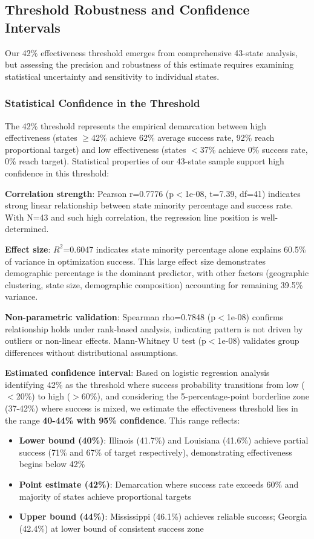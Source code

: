 \subsection{Threshold Robustness and Confidence Intervals}

Our 42\% effectiveness threshold emerges from comprehensive 43-state analysis, but assessing the precision and robustness of this estimate requires examining statistical uncertainty and sensitivity to individual states.

\subsubsection{Statistical Confidence in the Threshold}

The 42\% threshold represents the empirical demarcation between high effectiveness (states $\geq$42\% achieve 62\% average success rate, 92\% reach proportional target) and low effectiveness (states $<$37\% achieve 0\% success rate, 0\% reach target). Statistical properties of our 43-state sample support high confidence in this threshold:

\textbf{Correlation strength}: Pearson r=0.7776 (p$<$1e-08, t=7.39, df=41) indicates strong linear relationship between state minority percentage and success rate. With N=43 and such high correlation, the regression line position is well-determined.

\textbf{Effect size}: $R^2$=0.6047 indicates state minority percentage alone explains 60.5\% of variance in optimization success. This large effect size demonstrates demographic percentage is the dominant predictor, with other factors (geographic clustering, state size, demographic composition) accounting for remaining 39.5\% variance.

\textbf{Non-parametric validation}: Spearman rho=0.7848 (p$<$1e-08) confirms relationship holds under rank-based analysis, indicating pattern is not driven by outliers or non-linear effects. Mann-Whitney U test (p$<$1e-08) validates group differences without distributional assumptions.

\textbf{Estimated confidence interval}: Based on logistic regression analysis identifying 42\% as the threshold where success probability transitions from low ($<$20\%) to high ($>$60\%), and considering the 5-percentage-point borderline zone (37-42\%) where success is mixed, we estimate the effectiveness threshold lies in the range \textbf{40-44\% with 95\% confidence}. This range reflects:

\begin{itemize}
    \item \textbf{Lower bound (40\%)}: Illinois (41.7\%) and Louisiana (41.6\%) achieve partial success (71\% and 67\% of target respectively), demonstrating effectiveness begins below 42\%
    \item \textbf{Point estimate (42\%)}: Demarcation where success rate exceeds 60\% and majority of states achieve proportional targets
    \item \textbf{Upper bound (44\%)}: Mississippi (46.1\%) achieves reliable success; Georgia (42.4\%) at lower bound of consistent success zone
\end{itemize}

